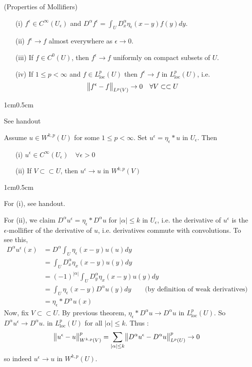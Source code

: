 \documentclass[10pt,a4paper]{report}
\newenvironment{proof}
{\begin{changemargin}{1cm}{0.5cm} 
	}%
	{\end{changemargin}
}
\begin{document}
\thm (Properties of Mollifiers) \begin{itemize}
\item[(i)] $f^{\epsilon} \in C^{\infty}(U_{\epsilon})$ and $D^{\alpha}f^{\epsilon} = \int_U D^{\alpha}_x \eta_{\epsilon}(x-y)f(y) dy$.
\item[(ii)] $f^{\epsilon}\rightarrow f$ almost everywhere as $\epsilon \rightarrow 0$.
\item[(iii)] If $f\in C^0 (U)$, then $f^{\epsilon} \rightarrow f$ uniformly on compact subsets of $U$.
\item[(iv)] If $1\leq p <\infty$ and $f \in L^p_{\text{loc}}(U)$ then $f^{\epsilon} \rightarrow f$ in $L^p_{\text{loc}}(U)$, i.e.
\begin{align*}
\bigl\lVert f^{\epsilon} - f\bigr\rVert_{L^p(V)} \rightarrow 0 \quad \forall V \subset\subset U
\end{align*}
\end{itemize}
\begin{proof}
\pf See handout
\end{proof}

\s

\lem Assume $u \in W^{k,p}(U)$ for some $1\leq p < \infty$. Set $u^{\epsilon} = \eta_{\epsilon} * u$ in $U_{\epsilon}$. Then
\begin{itemize}
\item[(i)] $u^{\epsilon} \in C^{\infty}(U_{\epsilon}) \quad \forall \epsilon >0$
\item[(ii)] If $V \subset \subset U$, then $u^{\epsilon} \rightarrow u$ in $W^{k,p}(V)$
\end{itemize}
\begin{proof}
\pf For (i), see handout.

For (ii), we claim $D^{\alpha} u^{\epsilon} = \eta_{\epsilon} * D^{\alpha} u$ for $|\alpha| \leq k$ in $U_{\epsilon}$, i.e. the derivative of $u^{\epsilon}$ is the $\epsilon$-mollifier of the derivative of $u$, i.e. derivatives commute with convolutions. To see this,
\begin{align*}
D^{\alpha} u^{\epsilon}(x) &= D^{\alpha} \int_U \eta_{\epsilon}(x-y) u(u) dy \\
&= \int_U D_x^{\alpha} \eta_x(x-y) u(y) dy \\
&= (-1)^{|\alpha|} \int_U D_y^{\alpha} \eta_x(x-y) u(y) dy \\
&= \int_U \eta_{\epsilon}(x-y) D^{\alpha} u(y) dy \quad \quad \text{(by definition of weak derivatives)} \\
&= \eta_{\epsilon} * D^{\alpha} u(x)
\end{align*}
Now, fix $V\subset \subset U$. By previous theorem, $\eta_{\epsilon} * D^{\alpha} u \rightarrow D^{\alpha} u$ in $L^p_{\text{loc}}(U)$. So $D^{\alpha} u^{\epsilon} \rightarrow D^{\alpha} u$. in $L^p_{\text{loc}}(U)$ for all $|\alpha| \leq k$. Thus :
\begin{align*}
\bigl\lVert u^{\epsilon}- u\bigr\rVert_{W^{k,p}(V)}^p = \sum_{|\alpha|\leq k} \bigl\lVert D^{\alpha} u^{\epsilon} - D^{\alpha}u\bigr\rVert_{L^p(U)}^p \rightarrow 0
\end{align*}
so indeed $u^{\epsilon} \rightarrow u$ in $W^{k,p}(U)$.

\eop
\end{proof}
\s
\end{document}
